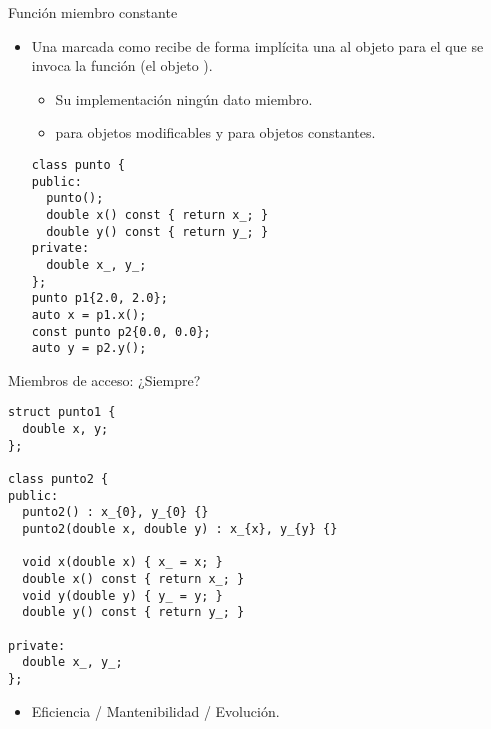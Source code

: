 \begin{frame}[t,fragile]{Función miembro constante}
\begin{itemize}
  \item Una  marcada como  
        recibe de forma implícita una 
        al objeto para el que se invoca la función (el objeto ).
    \begin{itemize}
      \item Su implementación  ningún dato miembro.
      \item {} para objetos 
            modificables y para objetos constantes.
    \end{itemize}
\begin{lstlisting}
class punto {
public:
  punto();
  double x() const { return x_; }
  double y() const { return y_; }
private:
  double x_, y_;
};
punto p1{2.0, 2.0};
auto x = p1.x();
const punto p2{0.0, 0.0};
auto y = p2.y();
\end{lstlisting}
\end{itemize}
\end{frame}

\begin{frame}[t,fragile]{Miembros de acceso: ¿Siempre?}
\begin{lstlisting}
struct punto1 {
  double x, y;
};

class punto2 {
public:
  punto2() : x_{0}, y_{0} {}
  punto2(double x, double y) : x_{x}, y_{y} {}
  
  void x(double x) { x_ = x; }
  double x() const { return x_; }
  void y(double y) { y_ = y; }
  double y() const { return y_; }

private:
  double x_, y_;
};
\end{lstlisting}
\begin{itemize}
  \item Eficiencia / Mantenibilidad / Evolución.
\end{itemize}
\end{frame}
